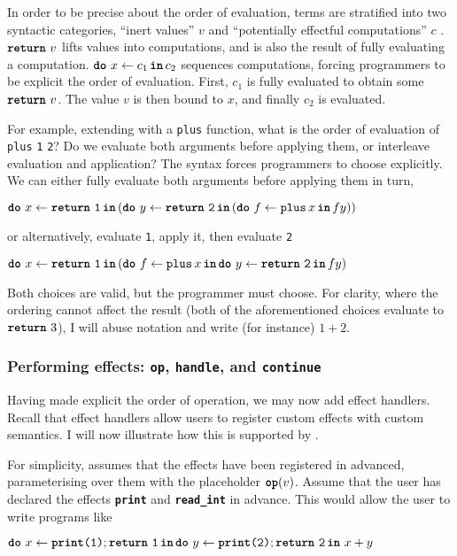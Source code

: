 In order to be precise about the order of evaluation, \efflang{} terms are stratified into two syntactic categories, ``inert values'' $v$ and ``potentially effectful computations'' $c$ \citep{pretnar-15}. $\texttt{\textbf{return}} \,\, {v}$ lifts values into computations, and is also the result of fully evaluating a computation. $\texttt{\textbf{do}} \,\, {x} \leftarrow {c_1} \, \textbf{\texttt{in}} \, {c_2}$ sequences computations, forcing programmers to be explicit the order of evaluation.  First, $c_1$ is fully evaluated to obtain some $\texttt{\textbf{return}} \,\, {v}$. The value $v$ is then bound to $x$, and finally $c_2$ is evaluated. 

For example, extending \efflang{} with a \texttt{plus} function, what is the order of evaluation of \texttt{plus} \texttt{1} \texttt{2}? Do we evaluate both arguments before applying them, or interleave evaluation and application? The syntax forces programmers to choose explicitly. We can either fully evaluate both arguments before applying them in turn, 
\begin{eff}
$\texttt{\textbf{do}} \,\, {x} \leftarrow {\texttt{\textbf{return}} \,\, {\texttt{1}}} \, \textbf{\texttt{in}} \, {(\texttt{\textbf{do}} \,\, {y} \leftarrow {\texttt{\textbf{return}} \,\, {\texttt{2}}} \, \textbf{\texttt{in}} \, {(\texttt{\textbf{do}} \,\, {f} \leftarrow {\texttt{plus} \, x} \, \textbf{\texttt{in}} \, {f y})})}$
\end{eff}
or alternatively, evaluate \texttt{1}, apply it, then evaluate \texttt{2}
\begin{eff}
$\texttt{\textbf{do}} \,\, {x} \leftarrow {\texttt{\textbf{return}} \,\, {\texttt{1}}} \, \textbf{\texttt{in}} \, {(\texttt{\textbf{do}} \,\, {f} \leftarrow {\texttt{plus} \, x} \, \textbf{\texttt{in}} \, {\texttt{\textbf{do}} \,\, {y} \leftarrow {\texttt{\textbf{return}} \,\, {\texttt{2}}} \, \textbf{\texttt{in}} \, {f y}})}$
\end{eff}

Both choices are valid, but the programmer must choose. For clarity, where the ordering cannot affect the result (both of the aforementioned choices evaluate to $\texttt{\textbf{return}} \,\, {3}$), I will abuse notation and write (for instance) $1+2$. 

\subsubsection{Performing effects: \texttt{op}, \texttt{handle}, and \texttt{continue}}
Having made explicit the order of operation, we may now add effect handlers. Recall that effect handlers allow users to register custom effects with custom semantics. I will now illustrate how this is supported by \efflang{}.

For simplicity, \efflang{} assumes that the effects have been registered in advanced, parameterising over them with the placeholder $\textbf{\texttt{op}}({v})$. Assume that the user has declared the effects \texttt{\textbf{print}} and \texttt{\textbf{read\_int}} in advance. This would allow the user to write programs like 
\begin{eff}
$\texttt{\textbf{do}} \,\, {x} \leftarrow {\texttt{\textbf{print}(1)};\texttt{\textbf{return}} \,\, {\texttt{1}}} \, \textbf{\texttt{in}} \, {{\texttt{\textbf{do}} \,\, {y} \leftarrow {\texttt{\textbf{print}(2)};\texttt{\textbf{return}} \,\, {\texttt{2}}} \, \textbf{\texttt{in}} \, {\, x + y}}}$
\end{eff}

